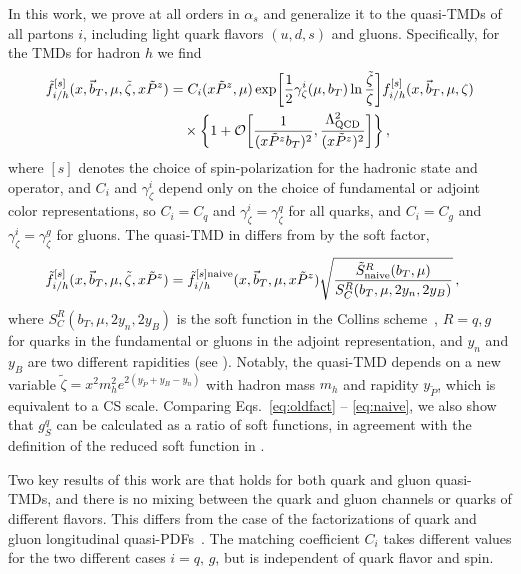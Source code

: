 \documentclass[11pt,a4paper]{article}
\newcommand{\cO}{\mathcal{O}}
\newcommand{\nn}{\nonumber}
\newcommand{\bt}{\vec b_T}
\begin{document}
In this work, we prove  at all orders in $\alpha_s$ and generalize it to the quasi-TMDs of all partons $i$, including light quark flavors $(u,d,s)$ and gluons. Specifically, for the TMDs for hadron $h$ we find
\begin{align} \label{eq:factorization_statement}
 \tilde f_{i/h}^{[s]}(x, \bt, \mu, \tilde\zeta, x\tilde P^z)
 &= C_i(x \tilde P^z, \mu)
    \exp\biggl[ \frac12 \gamma_\zeta^i(\mu, b_T) \ln\frac{\tilde\zeta }{\zeta}\biggr]
    f_{i/h}^{[s]}(x, \bt, \mu, \zeta)
\nn\\&\quad
\times\bigg\{ 1 + \cO\biggl[{1\over (x\tilde P^z b_T)^2}, {\Lambda_{\rm QCD}^2\over (x\tilde P^z)^2} \biggr] \bigg\}
\,,\end{align}
where $[s]$ denotes the choice of spin-polarization for the hadronic state and operator, and $C_i$ and $\gamma_\zeta^i$ depend only on the choice of fundamental or adjoint color representations, so $C_i=C_q$ and $\gamma_\zeta^i=\gamma_\zeta^q$  for all quarks, and $C_i = C_g$ and $\gamma^i_\zeta = \gamma^g_\zeta$ for gluons. The quasi-TMD in  differs from  by the soft factor,
\begin{align}\label{eq:naive}
 \tilde f_{i/h}^{[s]}(x, \bt, \mu, \tilde\zeta, x\tilde P^z)
  &= \tilde f_{i/h}^{[s]\rm naive}(x, \bt, \mu,  x\tilde P^z) \sqrt{ \frac{\tilde S^R_{\rm naive}(b_T, \mu)}{S_C^R(b_T, \mu, 2y_n, 2y_B)}}
\,,\end{align}
where $S_C^R(b_T, \mu, 2y_n, 2y_B)$ is the soft function in the Collins scheme~\cite{Collins:1350496}, $R=q,g$ for quarks in the fundamental or gluons in the adjoint representation, and  $y_n$ and $y_B$ are two different rapidities (see ). Notably, the quasi-TMD depends on a new variable $\tilde\zeta = x^2 m_h^2 e^{2( y_{\tilde P} + y_B-y_n)}$ with hadron mass $m_h$ and rapidity $ y_{\tilde P}$, which is equivalent to a CS scale.
Comparing Eqs.~\eqref{eq:oldfact} -- \eqref{eq:naive}, we also show that $g_S^q$ can be calculated as a ratio of soft functions, in agreement with the definition of the reduced soft function in .


Two key results of this work are that  holds for both quark and gluon quasi-TMDs, and there is no mixing between the quark and gluon channels or quarks of different flavors. This differs from the case of the factorizations of quark and gluon longitudinal quasi-PDFs~\cite{Zhang:2018diq}. The matching coefficient $C_i$ takes different values for the two different cases $i=q,\,g$, but is independent of quark flavor and spin.
\end{document}
